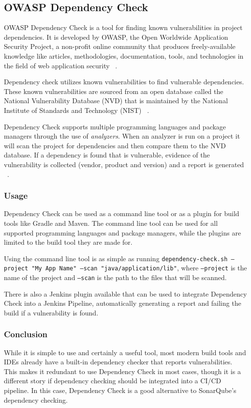 \subsection{OWASP Dependency Check}\label{subsec:owasp-dependency-check}

OWASP Dependency Check is a tool for finding known vulnerabilities in project dependencies.
It is developed by OWASP, the Open Worldwide Application Security Project,
a non-profit online community that produces freely-available knowledge like articles,
methodologies, documentation, tools, and technologies in the field of web application security ~\cite{owasp-about}.

Dependency check utilizes known vulnerabilities to find vulnerable dependencies.
These known vulnerabilities are sourced from an open database called the National Vulnerability Database (NVD) that is maintained
by the National Institute of Standards and Technology (NIST) ~\cite{nvd}.

Dependency Check supports multiple programming languages and package managers through the use of \emph{analyzers}.
When an analyzer is run on a project it will scan the project for dependencies and then compare them to the NVD database.
If a dependency is found that is vulnerable,
evidence of the vulnerability is collected (vendor, product and version) and a report is generated ~\cite{owasp-dependency-check-work}.

\subsubsection{Usage}

Dependency Check can be used as a command line tool or as a plugin for build tools like Gradle and Maven.
The command line tool can be used for all supported programming languages and package managers, while the plugins are limited to the build tool they are made for.

Using the command line tool is as simple as running \texttt{\scriptsize dependency-check.sh --project "My App Name" --scan "java/application/lib"}, where \texttt{\scriptsize--project} is the name of the project and \texttt{\scriptsize--scan} is the path to the files that will be scanned.

There is also a Jenkins plugin available that can be used to integrate Dependency Check into a Jenkins Pipeline,
automatically generating a report and failing the build if a vulnerability is found.

\subsubsection{Conclusion}\label{subsubsec:depencency-check-conclusion}

While it is simple to use and certainly a useful tool,
most modern build tools and IDEs already have a built-in dependency checker that reports vulnerabilities.
This makes it redundant to use Dependency Check in most cases, though it is a different story if dependency checking should be integrated into a CI/CD pipeline.
In this case, Dependency Check is a good alternative to SonarQube's dependency checking.

